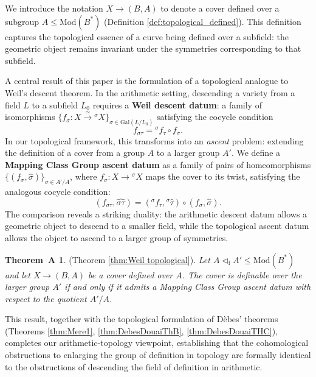\documentclass[10pt]{amsart}
\theoremstyle{definition}
\newtheorem*{thmA}{Theorem~A}
\newcommand{\Gal}{{ \mathrm{Gal}}}
\begin{document}
We introduce the notation $X \to (B,A)$ to denote a cover defined over a subgroup $A \leq \mathrm{Mod}(B^*)$ 
(Definition \ref{def:topological_defined}). This definition captures the topological essence of a curve being defined over a subfield: the geometric object remains invariant under the symmetries corresponding to that subfield.

A central result of this paper is the formulation of a topological analogue to Weil's descent theorem. In the arithmetic setting, descending a variety from a field $L$ to a subfield $L_0$ requires a \textbf{Weil descent datum}: a family of isomorphisms $\{f_\sigma\colon X \xrightarrow{\simeq} {^\sigma \! X}\}_{\sigma \in \Gal(L/L_0)}$ satisfying the cocycle condition
\[
    f_{\sigma \tau} = {^\sigma \! f_\tau} \circ f_\sigma.
\]
In our topological framework, this transforms into an \textit{ascent} problem: extending the definition of a cover from a group $A$ to a larger group $A'$. We define a \textbf{Mapping Class Group ascent datum} as a family of pairs of homeomorphisms $\{(f_\sigma, \hat{\sigma})\}_{\sigma \in A'/A}$, where $f_\sigma\colon X \to {^\sigma \! X}$ maps the cover to its twist, satisfying the analogous cocycle condition:
\[
    (f_{\sigma \tau}, \widehat{\sigma\tau}) = ({^\sigma \! f_\tau}, {^\sigma \! \hat{\tau}}) \circ (f_\sigma, \hat{\sigma}).
\]
The comparison reveals a striking duality: the arithmetic descent datum allows a geometric object to descend to a smaller field, while the topological ascent datum allows the object to ascend to a larger group of symmetries.

\begin{thmA} (Theorem \ref{thm:Weil topological}).
\textit{Let $A \lhd_{\mathrm{f}} A' \leq \mathrm{Mod}(B^*)$ and let $X \to (B,A)$ be a cover defined over $A$. The cover is definable over the larger group $A'$ if and only if it admits a Mapping Class Group ascent datum with respect to the quotient $A'/A$.
}
\end{thmA}

This result, together with the topological formulation of Dèbes' theorems (Theorems \ref{thm:Mere1}, \ref{thm:DebesDouaiThB}, \ref{thm:DebesDouaiTHC}), completes our arithmetic-topology viewpoint, establishing that the cohomological obstructions to enlarging the group of definition in topology are formally identical to the obstructions of descending the field of definition in arithmetic.
\end{document}
